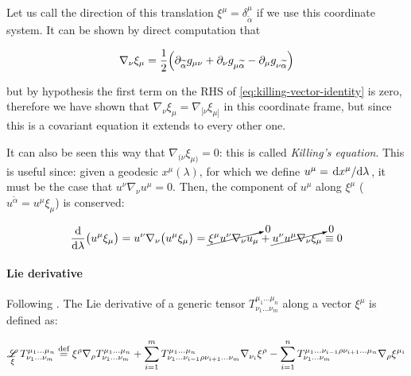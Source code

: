\documentclass[main.tex]{subfiles}
\begin{document}
Let us call the direction of this translation \(\xi^\mu = \delta^\mu_{\widetilde{\alpha}}\) if we use this coordinate system. It can be shown by direct computation that

\begin{equation} \label{eq:killing-vector-identity}
    \nabla_{\nu} \xi_\mu = \frac{1}{2} \qty(\partial_{\widetilde{\alpha}}
    g_{\mu\nu} + \partial_\nu g_{\mu\widetilde{\alpha}} -
    \partial_\mu g_{\nu \widetilde{\alpha}})
\end{equation}

but by hypothesis the first term on the RHS of \eqref{eq:killing-vector-identity} is zero, therefore we have shown that \(\nabla_{\nu} \xi_\mu = \nabla_{[\nu} \xi_{\mu]}\) in this coordinate frame, but since this is a covariant equation it extends to every other one.

It can also be seen this way that \(\nabla_{(\nu} \xi_{\mu)}=0\): this is called \emph{Killing's equation}. This is useful since: given a geodesic \(x^\mu(\lambda)\), for which we define \(u^\mu = \dv*{x^\mu}{\lambda} \), it must be the case that \(u^\nu \nabla_\nu u^\mu = 0 \). Then, the component of \(u^\mu\) along \(\xi^\mu\) (\(u^{\widetilde{\alpha}} = u^\mu \xi_\mu\)) is conserved:

\begin{equation}
    \dv{}{\lambda} \qty(u^\mu \xi_\mu) = u^\nu \nabla_\nu \qty(u^\mu \xi_\mu)
    = \cancelto{0}{\xi^\mu u^\nu \nabla_\nu u_\mu} + \cancelto{0}{u^\nu u^\mu \nabla_\nu \xi_\mu} \equiv 0
\end{equation}

\paragraph{Lie derivative}

Following \cite[section 6]{Taub:1978}. The Lie derivative of a generic tensor \(T^{\mu_1 \dots \mu_n} _{\nu_1 \dots \nu_m}\) along a vector \(\xi^\mu\) is defined as:

\begin{equation}
    \operatorname*{\mathscr L}_{\xi} T^{\mu_1 \dots \mu_n} _{\nu_1 \dots \nu_m} \stackrel{\text{def}}{=}
    \xi^\rho \nabla_\rho T^{\mu_1 \dots \mu_n} _{\nu_1 \dots \nu_m}
    + \sum_{i=1}^{m} T^{\mu_1 \dots \mu_n} _{\nu_1 \dots \nu_{i-1} \rho \nu_{i+1} \dots \nu_m} \nabla_{\nu_i} \xi^\rho
    - \sum_{i=1}^{n} T^{\mu_1 \dots \nu_{i-1} \rho \nu_{i+1} \dots \mu_n} _{\nu_1 \dots  \nu_m} \nabla_{\rho} \xi^{\mu_i}
\end{equation}
\end{document}
